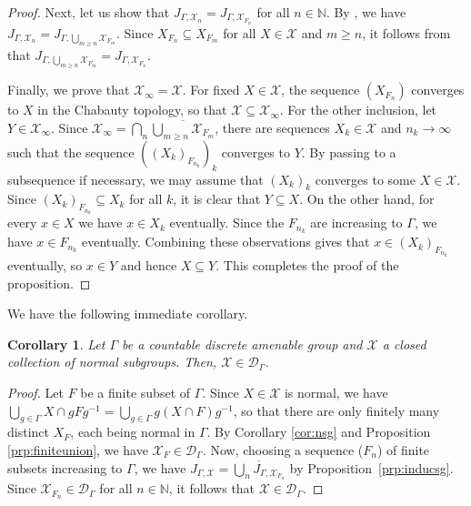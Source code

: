 \documentclass[11pt, oneside, reqno]{amsart}
\newtheorem{cor}[thm]{Corollary}
\theoremstyle{definition}
\theoremstyle{remark}
\numberwithin{equation}{section}
\begin{document}
\begin{proof}
    Next, let us show that $J_{\Gamma, \mathcal{X}_{n}} = J_{\Gamma, \mathcal{X}_{F_{n}}}$ for all $n\in\mathbb{N}$. By \cite[Proposition~3.3]{BK20}, we have $J_{\Gamma, \mathcal{X}_{n}} = J_{\Gamma, \bigcup_{m\geq n} \mathcal{X}_{F_{m}}}$. Since $X_{F_{n}}\subseteq X_{F_{m}}$ for all $X\in\mathcal{X}$ and $m\geq n$, it follows from \cite[Appendix~E~and~F]{BHV07} that $J_{\Gamma, \bigcup_{m\geq n} \mathcal{X}_{F_{m}}} = J_{\Gamma, \mathcal{X}_{F_{n}}}$.
    
    Finally, we prove that $\mathcal{X}_\infty = \mathcal{X}$. For fixed $X\in\mathcal{X}$, the sequence $(X_{F_{n}})$ converges to $X$ in the Chabauty topology, so that $\mathcal{X}\subseteq \mathcal{X}_{\infty}$. For the other inclusion, let $Y\in \mathcal{X}_{\infty}$. Since $\mathcal{X}_{\infty} = \bigcap_{n}\overline{\bigcup_{m\geq n}\mathcal{X}_{F_{m}}}$, there are sequences $X_k \in \mathcal{X}$ and $n_k \to \infty$ such that the sequence $((X_k)_{F_{n_k}})_k$ converges to $Y$. By passing to a subsequence if necessary, we may assume that $(X_k)_k$ converges to some $X\in\mathcal{X}$. Since $(X_k)_{F_{n_k}} \subseteq X_k$ for all $k$, it is clear that $Y \subseteq X$. On the other hand, for every $x\in X$ we have $x\in X_k$ eventually. Since the $F_{n_k}$ are increasing to $\Gamma$, we have $x\in F_{n_{k}}$ eventually. Combining these observations gives that $x\in (X_k)_{F_{n_k}}$ eventually, so $x\in Y$ and hence $X \subseteq Y$. This completes the proof of the proposition.
\end{proof}

We have the following immediate corollary.

\begin{cor}
    \label{cor:arbnsg}
    Let $\Gamma$ be a countable discrete amenable group and $\mathcal{X}$ a closed collection of normal subgroups. Then, $\mathcal{X}\in\mathcal{D}_{\Gamma}$.
\end{cor}
\begin{proof}
    Let $F$ be a finite subset of $\Gamma$. Since $X\in\mathcal{X}$ is normal, we have $\bigcup_{g\in \Gamma} X\cap gFg^{-1} = \bigcup_{g\in\Gamma} g(X\cap F)g^{-1}$, so that there are only finitely many distinct $X_{F}$, each being normal in $\Gamma$. By Corollary \ref{cor:nsg} and Proposition \ref{prp:finiteunion}, we have $\mathcal{X}_{F}\in\mathcal{D}_{\Gamma}$. Now, choosing a sequence ($F_{n}$) of finite subsets increasing to $\Gamma$, we have $J_{\Gamma, \mathcal{X}} = \overline{\bigcup_{n}J_{\Gamma,\mathcal{X}_{F_n}}}$ by Proposition~\ref{prp:inducsg}. Since  $\mathcal{X}_{F_{n}}\in\mathcal{D}_{\Gamma}$ for all $n\in\mathbb{N}$, it follows that $\mathcal{X}\in\mathcal{D}_{\Gamma}$.
\end{proof}
\end{document}
